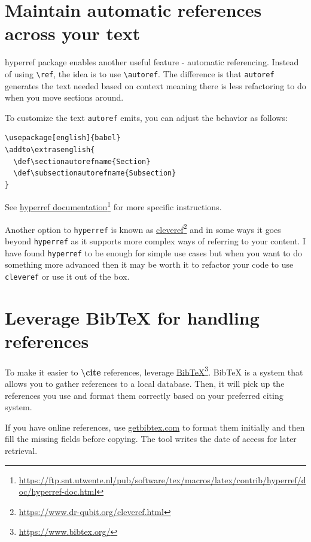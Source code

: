 \section{Maintain automatic references across your text}

hyperref package enables another useful feature - automatic referencing. Instead of using \texttt{\textbackslash ref}, the idea is to use \texttt{\textbackslash autoref}.
The difference is that \texttt{autoref} generates the text needed based on context meaning there is less refactoring to do when you move sections around.

To customize the text \texttt{autoref} emits, you can adjust the behavior as follows:

\begin{verbatim}
\usepackage[english]{babel}
\addto\extrasenglish{
  \def\sectionautorefname{Section}
  \def\subsectionautorefname{Subsection}
}
\end{verbatim}

See \href{https://ftp.snt.utwente.nl/pub/software/tex/macros/latex/contrib/hyperref/doc/hyperref-doc.html}{hyperref documentation}\footnote{\url{https://ftp.snt.utwente.nl/pub/software/tex/macros/latex/contrib/hyperref/doc/hyperref-doc.html}} for more specific instructions.

Another option to \texttt{hyperref} is known as \href{https://www.dr-qubit.org/cleveref.html}{cleveref}\footnote{\url{https://www.dr-qubit.org/cleveref.html}} and in some ways it goes beyond \texttt{hyperref} as it supports more complex ways of referring to your content.
I have found \texttt{hyperref} to be enough for simple use cases but when you want to do something more advanced then it may be worth it to refactor your code to use \texttt{cleveref} or use it out of the box.

\section{Leverage BibTeX for handling references}

To make it easier to \textbf{\textbackslash cite} references, leverage \href{https://www.bibtex.org/}{BibTeX}\footnote{\url{https://www.bibtex.org/}}. BibTeX is a system that allows you to gather references to a local database. 
Then, it will pick up the references you use and format them correctly based on your preferred citing system.

If you have online references, use \href{https://www.getbibtex.com/}{getbibtex.com} to format them initially and then fill the missing fields before copying.
The tool writes the date of access for later retrieval. %

